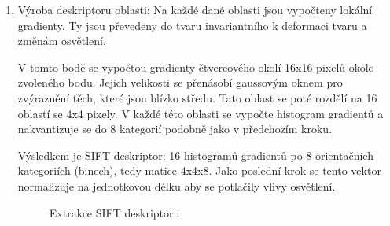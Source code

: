 \begin{enumerate}
		\item Výroba deskriptoru oblasti: Na každé dané oblasti jsou vypočteny lokální gradienty. Ty jsou převedeny do tvaru invariantního k deformaci tvaru a změnám osvětlení.
		
			V tomto bodě se vypočtou gradienty čtvercového okolí 16x16 pixelů okolo zvoleného bodu. Jejich velikosti se přenásobí gaussovým oknem pro zvýraznění těch, které jsou blízko středu. Tato oblast se poté rozdělí na 16 oblastí se 4x4 pixely. V každé této oblasti se vypočte histogram gradientů a nakvantizuje se do 8 kategorií podobně jako v předchozím kroku.
			
			Výsledkem je SIFT deskriptor: 16 histogramů gradientů po 8 orientačních kategoriích (binech), tedy matice 4x4x8. Jako poslední krok se tento vektor normalizuje na jednotkovou délku aby se potlačily vlivy osvětlení. 
			
			\begin{figure}[htp] 
				\caption{Extrakce SIFT deskriptoru} 	\label{sift_kp}
			\end{figure}
			
	\end{enumerate}
	
